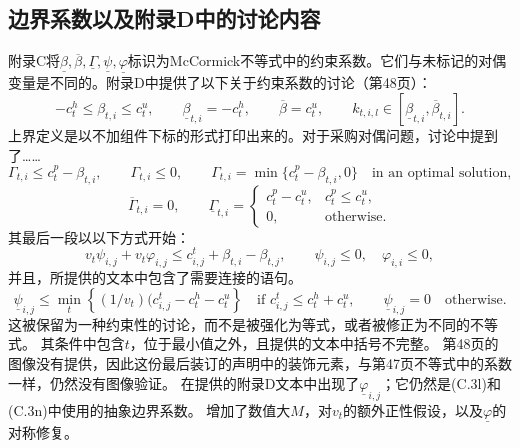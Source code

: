 \documentclass{article}
\begin{document}
\subsection*{边界系数以及附录D中的讨论内容}
附录C将$\underline\beta,\overline\beta,
\underline\Gamma,\underline\psi,\underline\varphi$标识为McCormick不等式中的约束系数。它们与未标记的对偶变量是不同的。附录D中提供了以下关于约束系数的讨论（第48页）：
\[
-c_t^h\leq\beta_{t,i}\leq c_t^u,\qquad
\underline\beta_{t,i}=-c_t^h,\qquad \overline\beta=c_t^u,
\qquad k_{t,i,l}\in[\underline\beta_{t,i},\overline\beta_{t,i}].
\]
上界定义是以不加组件下标的形式打印出来的。对于采购对偶问题，讨论中提到了……
\[
\Gamma_{t,i}\leq c_t^p-\beta_{t,i},\qquad \Gamma_{t,i}\leq0,
\qquad \Gamma_{t,i}=\min\{c_t^p-\beta_{t,i},0\}
\quad\text{in an optimal solution},
\]
\[
\overline\Gamma_{t,i}=0,\qquad
\underline\Gamma_{t,i}=
\begin{cases}
c_t^p-c_t^u,&c_t^p\leq c_t^u,\\
0,&\text{otherwise}.
\end{cases}
\]
其最后一段以以下方式开始：
\[
v_t\psi_{i,j}+v_t\varphi_{i,j}\leq c^t_{i,j}+\beta_{t,i}-\beta_{t,j},
\qquad \psi_{i,j}\leq0,\quad\varphi_{i,i}\leq0,
\]
并且，所提供的文本中包含了需要连接的语句。
\[
\underline\psi_{i,j}\leq
\min_t\left\{(1/v_t)(c^t_{i,j}-c_t^h-c_t^u\right\}
\quad\text{if }c^t_{i,j}\leq c_t^h+c_t^u,
\qquad \underline\psi_{i,j}=0\quad\text{otherwise}.
\]
这被保留为一种约束性的讨论，而不是被强化为等式，或者被修正为不同的不等式。 其条件中包含$t$，位于最小值之外，且提供的文本中括号不完整。 第48页的图像没有提供，因此这份最后装订的声明中的装饰元素，与第47页不等式中的系数一样，仍然没有图像验证。 在提供的附录D文本中出现了$\underline\varphi_{i,j}$；它仍然是(C.3l)和(C.3n)中使用的抽象边界系数。 增加了数值大$M$，对$v_t$的额外正性假设，以及$\underline\varphi$的对称修复。
\end{document}
